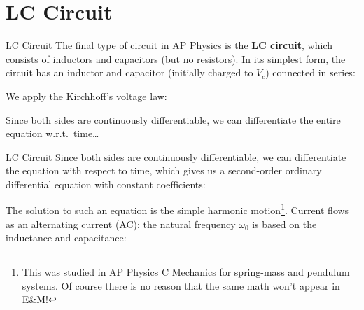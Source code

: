 \documentclass[12pt,aspectratio=169]{beamer}
\begin{document}
\section{LC Circuit}

\begin{frame}{LC Circuit}
  The final type of circuit in AP Physics is the \textbf{LC circuit}, which
  consists of inductors and capacitors (but no resistors). In its simplest
  form, the circuit has an inductor and capacitor (initially charged to $V_c$)
  connected in series:
  \begin{center}
  \end{center}
  We apply the Kirchhoff's voltage law:
  
  
  Since both sides are continuously differentiable, we can differentiate the
  entire equation w.r.t.\ time\ldots
\end{frame}



\begin{frame}{LC Circuit}
  Since both sides are continuously differentiable, we can differentiate the
  equation with respect to time, which gives us a second-order ordinary
  differential equation with constant coefficients:


  The solution to such an equation is the simple harmonic motion\footnote{This
  was studied in AP Physics C Mechanics for spring-mass and pendulum systems.
  Of course there is no reason that the same math won't appear in E\&M!}.
  Current flows as an alternating current (AC); the natural frequency
  $\omega_0$ is based on the inductance and capacitance:

\end{frame}
\end{document}
